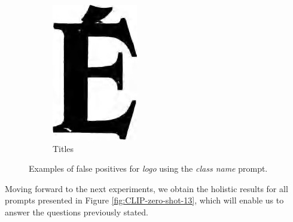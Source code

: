 \begin{figure}[ht]
\begin{minipage}[5cm]{0.3\textwidth}
        \begin{subfigure}{1.7cm}
            \includegraphics[width=\linewidth]{Images/logo FPs/titles/LCE-1942-05-20-a-i0019.jpg}
             \caption{Titles}
        \end{subfigure}
    \end{minipage}

    \caption{Examples of false positives for \textit{logo} using the \textit{class name} prompt.}
    \label{fig:logo_FPs}
\end{figure}


Moving forward to the next experiments, we obtain the holistic results for all prompts presented in Figure \ref{fig:CLIP-zero-shot-13}, which will enable us to answer the questions previously stated.
 
